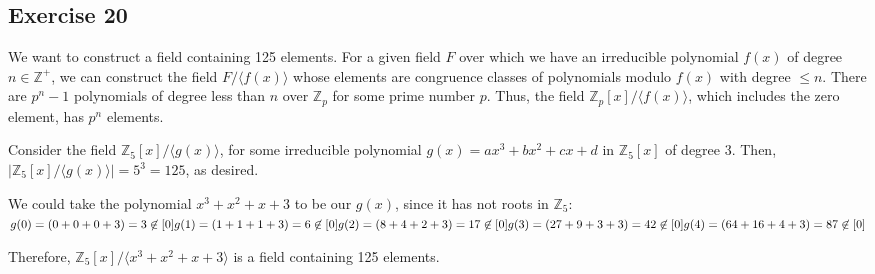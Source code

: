 \subsection*{Exercise 20}
We want to construct a field containing 125 elements. For a given field $F$ over which we have an irreducible polynomial $f(x)$ of degree $n \in \mathbb{Z}^+$, we can construct the field $F/\langle f(x) \rangle$ whose elements are congruence classes of polynomials modulo $f(x)$ with degree $\le n$. There are $p^n - 1$ polynomials of degree less than $n$ over $\mathbb{Z}_p$ for some prime number $p$. Thus, the field $\mathbb{Z}_p[x]/\langle f(x) \rangle$, which includes the zero element, has $p^n$ elements.

Consider the field $\mathbb{Z}_5[x]/\langle g(x) \rangle$, for some irreducible polynomial $g(x) = ax^3 + bx^2 + cx + d$ in $\mathbb{Z}_5[x]$ of degree 3. Then, $|\mathbb{Z}_5[x]/\langle g(x) \rangle| = 5^3 = 125$, as desired.

We could take the polynomial $x^3 + x^2 + x + 3$ to be our $g(x)$, since it has not roots in $\mathbb{Z}_5$: \\
$g(0) = (0+0+0+3) = 3 \not\in [0] \\
g(1) = (1+1+1+3) = 6 \not\in [0] \\
g(2) = (8+4+2+3) = 17 \not\in [0] \\
g(3) = (27+9+3+3) = 42 \not\in [0] \\
g(4) = (64+16+4+3) = 87 \not\in [0]$

Therefore, $\mathbb{Z}_5[x]/\langle x^3 + x^2 + x + 3 \rangle$ is a field containing 125 elements.